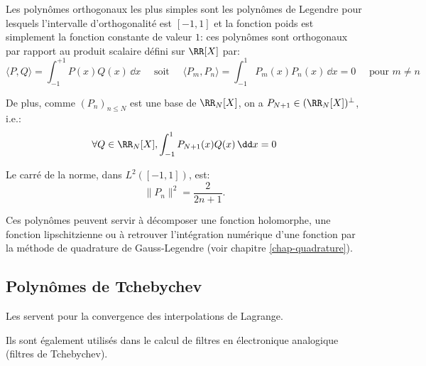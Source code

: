 \medskip
Les polynômes orthogonaux les plus simples sont les polynômes de Legendre 
pour lesquels  l'intervalle d'orthogonalité est $[-1, 1]$ et la fonction poids est simplement la fonction 
constante de valeur $1$: 
ces polynômes sont orthogonaux par rapport au produit scalaire défini sur $\RR[X]$ par:
\begin{equation}
    \langle P,Q\rangle= \int_{-1}^{+1} P(x) Q(x)\, \dd x
   \quad \text{ soit } \quad 
    \langle P_m,P_n\rangle= \int_{-1}^{1} P_m(x)P_n(x)\,\dd x = 0\quad \text{ pour } m \ne n 
\end{equation}

\medskip
De plus, comme $(P_n)_{n\leq N}$ est une base de $\RR_N[X]$, 
on a $P_{N+1} \in (\RR_N[X])^\bot$, i.e.:
\begin{equation}
    \forall Q \in \RR_N[X], \int_{-1}^{1} P_{N+1}(x)Q(x)\,\dd x = 0
\end{equation}

\medskip
Le carré de la norme, dans $L^2([-1,1])$, est:
\begin{equation}
    \|P_n\|^2=\frac{2}{2n+1}. 
\end{equation}


\medskip
Ces polynômes peuvent servir à décomposer une fonction holomorphe,
une fonction lipschitzienne ou à retrouver l'intégration numérique d'une fonction par
la méthode de quadrature de Gauss-Legendre (voir chapitre \ref{chap-quadrature}).




\medskip
\subsection{Polynômes de Tchebychev}

Les  servent pour la convergence des interpolations de Lagrange.

Ils sont également utilisés dans le calcul de filtres en électronique analogique (filtres de Tchebychev).

